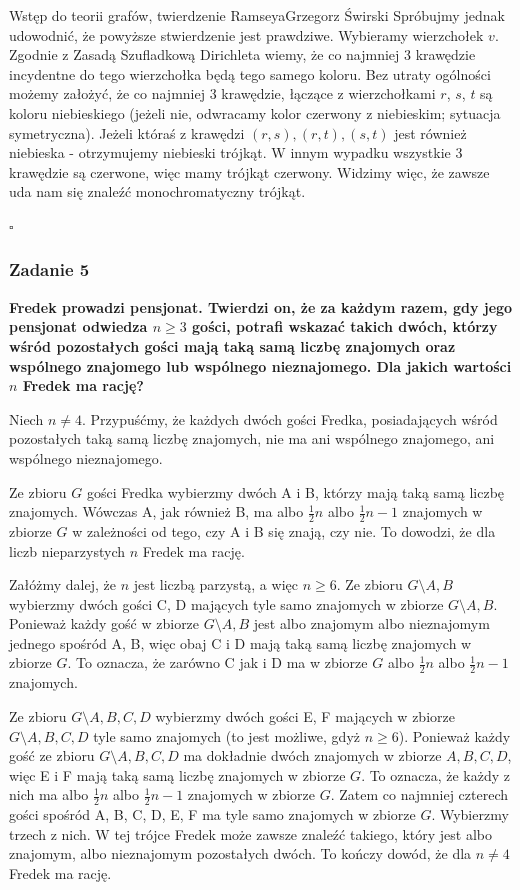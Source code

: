 \begin{referat}{Wstęp do teorii grafów, twierdzenie Ramseya}{Grzegorz Świrski}
Spróbujmy jednak udowodnić, że powyższe stwierdzenie jest prawdziwe. Wybieramy wierzchołek $v$. Zgodnie z Zasadą Szufladkową Dirichleta wiemy, że co najmniej 3 krawędzie incydentne do tego wierzchołka będą tego samego koloru. Bez utraty ogólności możemy założyć, że co najmniej 3 krawędzie, łączące z wierzchołkami $r$, $s$, $t$ są koloru niebieskiego (jeżeli nie, odwracamy kolor czerwony z niebieskim; sytuacja symetryczna). Jeżeli któraś z krawędzi $(r,s), (r, t), (s,t)$ jest również niebieska - otrzymujemy niebieski trójkąt. W innym wypadku wszystkie 3 krawędzie są czerwone, więc mamy trójkąt czerwony. Widzimy więc, że zawsze uda nam się znaleźć monochromatyczny trójkąt.
\begin{flushright}
$\square$
\end{flushright}


\subsubsection{Zadanie 5}
\textbf{Fredek prowadzi pensjonat. Twierdzi on, że za każdym razem, gdy jego pensjonat odwiedza $n \geq 3$ gości, potrafi wskazać takich dwóch, którzy wśród pozostałych gości mają taką samą liczbę znajomych oraz wspólnego znajomego lub wspólnego nieznajomego. Dla jakich wartości $n$ Fredek ma rację?}

Niech $n \neq 4$. Przypuśćmy, że każdych dwóch gości Fredka, posiadających wśród pozostałych taką samą liczbę znajomych, nie ma ani wspólnego znajomego, ani wspólnego nieznajomego.

Ze zbioru $G$ gości Fredka wybierzmy dwóch A i B, którzy mają taką samą liczbę znajomych. Wówczas A, jak również B, ma albo $\frac{1}{2}n$ albo $\frac{1}{2}n - 1$ znajomych w zbiorze $G$ w zależności od tego, czy A i B się znają, czy nie. To dowodzi, że dla liczb nieparzystych $n$ Fredek ma rację.

Załóżmy dalej, że $n$ jest liczbą parzystą, a więc $n \geq 6$. Ze zbioru $G \setminus {A,B}$ wybierzmy dwóch gości C, D mających tyle samo znajomych w zbiorze $G \setminus {A,B}$. Ponieważ każdy gość w zbiorze $G \setminus {A,B}$ jest albo znajomym albo nieznajomym jednego spośród A, B, więc obaj C i D mają taką samą liczbę znajomych w zbiorze $G$. To oznacza, że zarówno C jak i D ma w zbiorze $G$ albo $\frac{1}{2}n$ albo $\frac{1}{2}n - 1$ znajomych.

Ze zbioru $G \setminus {A,B,C,D}$ wybierzmy dwóch gości E, F mających w zbiorze $G \setminus {A,B,C,D}$ tyle samo znajomych (to jest możliwe, gdyż $n \geq 6$). Ponieważ każdy gość ze zbioru $G \setminus {A,B,C,D}$ ma dokładnie dwóch znajomych w zbiorze ${A,B,C,D}$, więc E i F mają taką samą liczbę znajomych w zbiorze $G$. To oznacza, że każdy z nich ma albo $\frac{1}{2}n$ albo $\frac{1}{2}n - 1$ znajomych w zbiorze $G$. Zatem co najmniej czterech gości spośród A, B, C, D, E, F ma tyle samo znajomych w zbiorze $G$. Wybierzmy trzech z nich. W tej trójce Fredek może zawsze znaleźć takiego, który jest albo znajomym, albo nieznajomym pozostałych dwóch. To kończy dowód, że dla $n \neq 4$ Fredek ma rację.


\end{referat}
